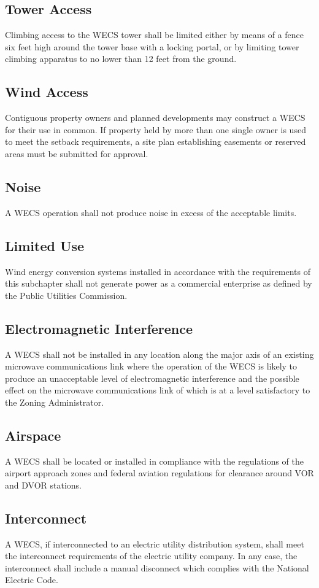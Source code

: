 \subsection{Tower Access}
Climbing access to the WECS tower shall be limited either by means of a fence six feet high around the tower base with a locking portal, or by limiting tower climbing apparatus to no lower than 12 feet from the ground.
\subsection{Wind Access}
Contiguous property owners and planned developments may construct a WECS for their use in common. If property held by more than one single owner is used to meet the setback requirements, a site plan establishing easements or reserved areas must be submitted for approval.
\subsection{Noise}
A WECS operation shall not produce noise in excess of the acceptable limits.
\subsection{Limited Use}
Wind energy conversion systems installed in accordance with the requirements of this subchapter shall not generate power as a commercial enterprise as defined by the Public Utilities Commission.
\subsection{Electromagnetic Interference}
A WECS shall not be installed in any location along the major axis of an existing microwave communications link where the operation of the WECS is likely to produce an unacceptable level of electromagnetic interference and the possible effect on the microwave communications link of which is at a level satisfactory to the Zoning Administrator.
\subsection{Airspace}
A WECS shall be located or installed in compliance with the regulations of the airport approach zones and federal aviation regulations for clearance around VOR and DVOR stations.
\subsection{Interconnect}
A WECS, if interconnected to an electric utility distribution system, shall meet the interconnect requirements of the electric utility company. In any case, the interconnect shall include a manual disconnect which complies with the National Electric Code.

